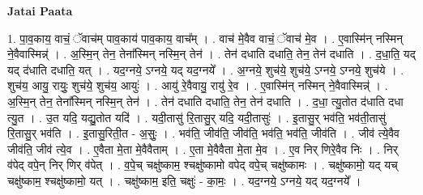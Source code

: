 \documentclass[17pt]{extarticle}
\begin{document}
\textbf{Jatai Paata} \newline

1. पा॒व॒काय॒ वाचं॒ ॅवाच॑म् पाव॒काय॑ पाव॒काय॒ वाच᳚म् । . वाच॑ मे॒वैव वाचं॒ ॅवाच॑ मे॒व । . ए॒वास्मि॑न् नस्मिन् ने॒वैवास्मिन्न्॑ । . अ॒स्मि॒न् तेन॒ तेना᳚स्मिन् नस्मि॒न् तेन॑ । . तेन॑ दधाति दधाति॒ तेन॒ तेन॑ दधाति । . द॒धा॒ति॒ यद् यद् द॑धाति दधाति॒ यत् । . यद॒ग्नये॒ ऽग्नये॒ यद् यद॒ग्नये᳚ । . अ॒ग्नये॒ शुच॑ये॒ शुच॑ये॒ ऽग्नये॒ ऽग्नये॒ शुच॑ये । . शुच॑य॒ आयु॒ रायुः॒ शुच॑ये॒ शुच॑य॒ आयुः॑ । . आयु॑ रे॒वैवायु॒ रायु॑ रे॒व । . ए॒वास्मि॑न् नस्मिन् ने॒वैवास्मिन्न्॑ । . अ॒स्मि॒न् तेन॒ तेना᳚स्मिन् नस्मि॒न् तेन॑ । . तेन॑ दधाति दधाति॒ तेन॒ तेन॑ दधाति । . द॒धा॒ त्यु॒तोत द॑धाति दधा त्यु॒त । . उ॒त यदि॒ यद्यु॒तोत यदि॑ । . यदी॒तासु॑ रि॒तासु॒र् यदि॒ यदी॒तासुः॑ । . इ॒तासु॒र् भव॑ति॒ भव॑ती॒तासु॑ रि॒तासु॒र् भव॑ति । . इ॒तासु॒रिती॒त - अ॒सुः॒ । . भव॑ति॒ जीव॑ति॒ जीव॑ति॒ भव॑ति॒ भव॑ति॒ जीव॑ति । . जीव॑ त्ये॒वैव जीव॑ति॒ जीव॑ त्ये॒व । . ए॒वैता मे॒ता मे॒वैवैताम् । . ए॒ता मे॒वैवैता मे॒ता मे॒व । . ए॒व निर् णिरे॒वैव निः । . निर् व॑पेद् वपे॒न् निर् णिर् व॑पेत् । . व॒पे॒च् चक्षु॑ष्काम॒ श्चक्षु॑ष्कामो वपेद् वपे॒च् चक्षु॑ष्कामः । . चक्षु॑ष्कामो॒ यद् यच् चक्षु॑ष्काम॒ श्चक्षु॑ष्कामो॒ यत् । . चक्षु॑ष्काम॒ इति॒ चक्षुः॑ - का॒मः॒ । . यद॒ग्नये॒ ऽग्नये॒ यद् यद॒ग्नये᳚ । \newline
\end{document}
